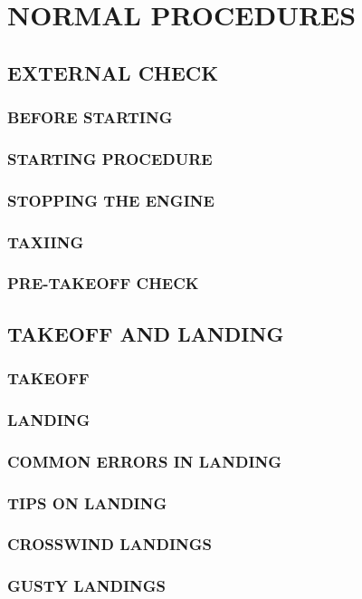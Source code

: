 \chapter{NORMAL PROCEDURES}
\minitoc{}
\cleardoublepage{}


\section{EXTERNAL CHECK}
\subsection{BEFORE STARTING}
\subsection{STARTING PROCEDURE}
\subsection{STOPPING THE ENGINE}
\subsection{TAXIING}
\subsection{PRE-TAKEOFF CHECK}


\section{TAKEOFF AND LANDING}
\subsection{TAKEOFF}
\subsection{LANDING}
\subsection{COMMON ERRORS IN LANDING}
\subsection{TIPS ON LANDING}
\subsection{CROSSWIND LANDINGS}
\subsection{GUSTY LANDINGS}
